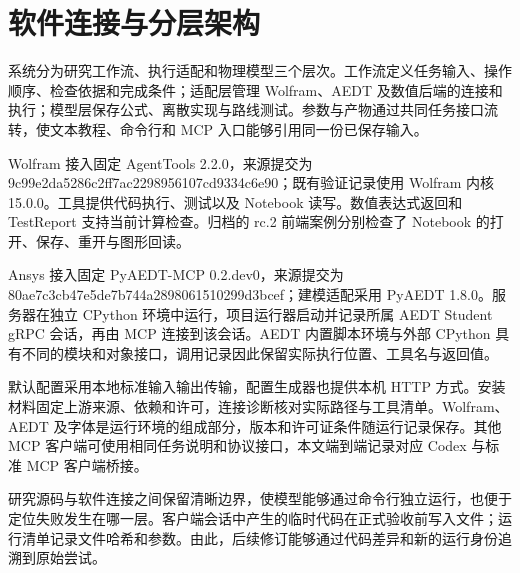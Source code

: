 \section{软件连接与分层架构}
\label{chapter:02}

\hypertarget{auto.02.p1}{}
系统分为研究工作流、执行适配和物理模型三个层次。工作流定义任务输入、操作顺序、检查依据和完成条件；适配层管理 Wolfram、AEDT 及数值后端的连接和执行；模型层保存公式、离散实现与路线测试。参数与产物通过共同任务接口流转，使文本教程、命令行和 MCP 入口能够引用同一份已保存输入。

\hypertarget{auto.02.p2}{}
Wolfram 接入固定 AgentTools 2.2.0，来源提交为 9c99e2da5286c2ff7ac2298956107cd9334c6e90；既有验证记录使用 Wolfram 内核 15.0.0。工具提供代码执行、测试以及 Notebook 读写。数值表达式返回和 TestReport 支持当前计算检查。归档的 rc.2 前端案例分别检查了 Notebook 的打开、保存、重开与图形回读。\cite{AGENTTOOLS}

\hypertarget{auto.02.p3}{}
Ansys 接入固定 PyAEDT-MCP 0.2.dev0，来源提交为 80ae7c3cb47e5de7b744a2898061510299d3bcef；建模适配采用 PyAEDT 1.8.0。服务器在独立 CPython 环境中运行，项目运行器启动并记录所属 AEDT Student gRPC 会话，再由 MCP 连接到该会话。AEDT 内置脚本环境与外部 CPython 具有不同的模块和对象接口，调用记录因此保留实际执行位置、工具名与返回值。\cite{PYAEDTMCP,PYAEDT,ANSYSCOMMONMCP}

\hypertarget{auto.02.p4}{}
默认配置采用本地标准输入输出传输，配置生成器也提供本机 HTTP 方式。安装材料固定上游来源、依赖和许可，连接诊断核对实际路径与工具清单。Wolfram、AEDT 及字体是运行环境的组成部分，版本和许可证条件随运行记录保存。其他 MCP 客户端可使用相同任务说明和协议接口，本文端到端记录对应 Codex 与标准 MCP 客户端桥接。

\hypertarget{auto.02.p5}{}
研究源码与软件连接之间保留清晰边界，使模型能够通过命令行独立运行，也便于定位失败发生在哪一层。客户端会话中产生的临时代码在正式验收前写入文件；运行清单记录文件哈希和参数。由此，后续修订能够通过代码差异和新的运行身份追溯到原始尝试。
